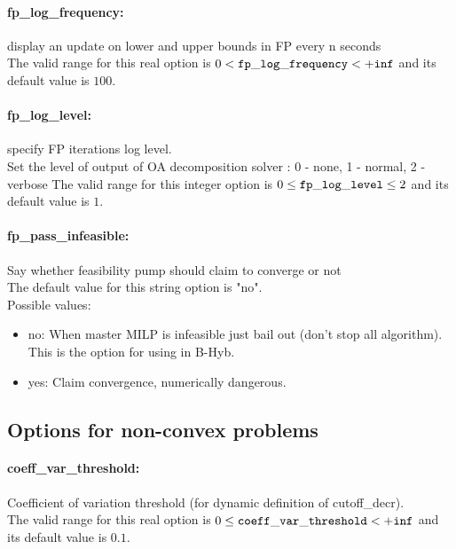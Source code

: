\paragraph{\bf fp\_log\_frequency:}\label{sec:fp_log_frequency} display an update on lower and upper bounds in FP every n seconds $\;$ \\
 The valid range for this real option is 
$0 <  {\tt fp\_log\_frequency } <  {\tt +inf}$
and its default value is $100$.


\paragraph{\bf fp\_log\_level:}\label{sec:fp_log_level} specify FP iterations log level. $\;$ \\
 Set the level of output of OA decomposition
solver : 0 - none, 1 - normal, 2 - verbose The valid range for this integer option is
$0 \le {\tt fp\_log\_level } \le 2$
and its default value is $1$.


\paragraph{\bf fp\_pass\_infeasible:}\label{sec:fp_pass_infeasible} Say whether feasibility pump should claim to converge or not $\;$ \\

The default value for this string option is "no".
\\ 
Possible values:
\begin{itemize}
   \item no: When master MILP is infeasible just bail out
(don't stop all algorithm). This is the option
for using in B-Hyb.
   \item yes: Claim convergence, numerically dangerous.
\end{itemize}

\subsection{Options for non-convex problems}
\label{sec:Options_for_non-convex_problems}
\paragraph{\bf coeff\_var\_threshold:}\label{sec:coeff_var_threshold} Coefficient of variation threshold (for dynamic definition of cutoff\_decr). $\;$ \\
 The valid range for this real option is 
$0 \le {\tt coeff\_var\_threshold } <  {\tt +inf}$
and its default value is $0.1$.


